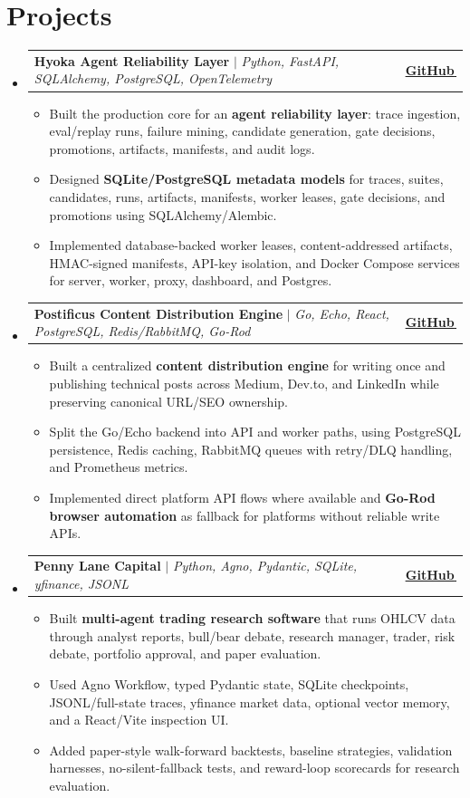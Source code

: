 \documentclass[letterpaper,11pt]{article}
\makeatletter
\newcommand{\bodyhref}[2]{\href{#1}{\underline{#2}\,\faExternalLink*}}
\newcommand{\resumeItem}[1]{\item{\fontsize{8.82pt}{9.28pt}\selectfont #1\vspace{-0.7pt}}}
\newcommand{\resumeProjectHeading}[2]{
    \item
    \begin{tabular*}{1.0\textwidth}{l@{\extracolsep{\fill}}r}
      \small#1 & \textbf{\small #2}\\
    \end{tabular*}\vspace{-4pt}
}
\newcommand{\resumeSubHeadingListStart}{\begin{itemize}[leftmargin=0.0in, label={}, itemsep=0.6pt, topsep=0pt, parsep=0pt, partopsep=0pt]}
\newcommand{\resumeSubHeadingListEnd}{\end{itemize}}
\newcommand{\resumeItemListStart}{\begin{itemize}[leftmargin=0.16in,itemsep=0.3pt,topsep=0.9pt,parsep=0pt,partopsep=0pt]}
\newcommand{\resumeItemListEnd}{\end{itemize}\vspace{-3pt}}
\makeatother
\begin{document}
\section{Projects}
\resumeSubHeadingListStart
\resumeProjectHeading
{\textbf{Hyoka Agent Reliability Layer} $|$ \emph{Python, FastAPI, SQLAlchemy, PostgreSQL, OpenTelemetry}}{\bodyhref{https://github.com/unichronic/hyoka}{GitHub}}
\resumeItemListStart
\resumeItem{Built the production core for an \textbf{agent reliability layer}: trace ingestion, eval/replay runs, failure mining, candidate generation, gate decisions, promotions, artifacts, manifests, and audit logs.}
\resumeItem{Designed \textbf{SQLite/PostgreSQL metadata models} for traces, suites, candidates, runs, artifacts, manifests, worker leases, gate decisions, and promotions using SQLAlchemy/Alembic.}
\resumeItem{Implemented database-backed worker leases, content-addressed artifacts, HMAC-signed manifests, API-key isolation, and Docker Compose services for server, worker, proxy, dashboard, and Postgres.}
\resumeItemListEnd
\resumeProjectHeading
{\textbf{Postificus Content Distribution Engine} $|$ \emph{Go, Echo, React, PostgreSQL, Redis/RabbitMQ, Go-Rod}}{\bodyhref{https://github.com/unichronic/postificus}{GitHub}}
\resumeItemListStart
\resumeItem{Built a centralized \textbf{content distribution engine} for writing once and publishing technical posts across Medium, Dev.to, and LinkedIn while preserving canonical URL/SEO ownership.}
\resumeItem{Split the Go/Echo backend into API and worker paths, using PostgreSQL persistence, Redis caching, RabbitMQ queues with retry/DLQ handling, and Prometheus metrics.}
\resumeItem{Implemented direct platform API flows where available and \textbf{Go-Rod browser automation} as fallback for platforms without reliable write APIs.}
\resumeItemListEnd
\resumeProjectHeading
{\textbf{Penny Lane Capital} $|$ \emph{Python, Agno, Pydantic, SQLite, yfinance, JSONL}}{\bodyhref{https://github.com/unichronic/pennylane}{GitHub}}
\resumeItemListStart
\resumeItem{Built \textbf{multi-agent trading research software} that runs OHLCV data through analyst reports, bull/bear debate, research manager, trader, risk debate, portfolio approval, and paper evaluation.}
\resumeItem{Used Agno Workflow, typed Pydantic state, SQLite checkpoints, JSONL/full-state traces, yfinance market data, optional vector memory, and a React/Vite inspection UI.}
\resumeItem{Added paper-style walk-forward backtests, baseline strategies, validation harnesses, no-silent-fallback tests, and reward-loop scorecards for research evaluation.}
\resumeItemListEnd
\resumeSubHeadingListEnd
\end{document}
